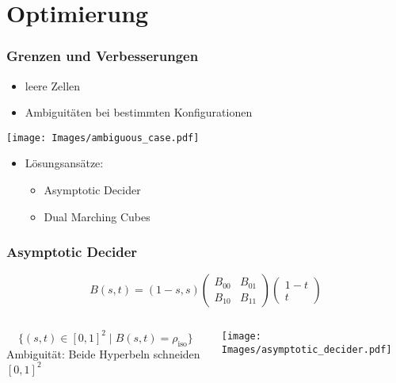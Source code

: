 \documentclass{beamer}
\begin{document}
\section{Optimierung}
\begin{frame}[t]
  \frametitle{Grenzen und Verbesserungen}
  \begin{itemize}
    \item leere Zellen
    \item Ambiguitäten bei bestimmten Konfigurationen
  \end{itemize}

  \begin{center}
  \texttt{[image: Images/ambiguous\_case.pdf]}
  \end{center}

  \begin{itemize}
    \item Lösungsansätze:
    \begin{itemize}
      \item Asymptotic Decider
      \item Dual Marching Cubes
    \end{itemize}
  \end{itemize}
\end{frame}

\begin{frame}[t]
  \frametitle{Asymptotic Decider}
    \centering
    \[
    B(s, t) =
    (1 - s, s)
    \begin{pmatrix}
    B_{00} & B_{01} \\
    B_{10} & B_{11}
    \end{pmatrix}
    \begin{pmatrix}
    1 - t \\
    t
    \end{pmatrix}
    \]

\begin{columns}[c]

  \vspace{-10cm}
  \[
    \{(s, t) \in [0,1]^2 \mid B(s, t) = \rho_{\text{iso}}\}
  \]
  Ambiguität: Beide Hyperbeln schneiden $[0, 1]^2$

  \centering
  \vspace{0.2cm}
  \texttt{[image: Images/asymptotic\_decider.pdf]}

\end{columns}

\end{frame}
\end{document}
